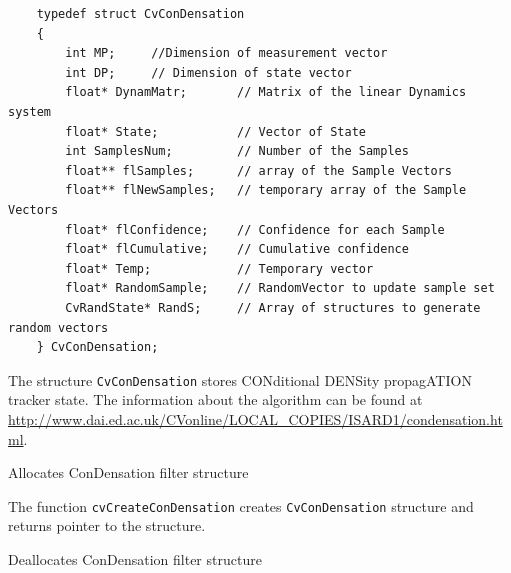 \begin{lstlisting}
    typedef struct CvConDensation
    {
        int MP;     //Dimension of measurement vector
        int DP;     // Dimension of state vector
        float* DynamMatr;       // Matrix of the linear Dynamics system
        float* State;           // Vector of State
        int SamplesNum;         // Number of the Samples
        float** flSamples;      // array of the Sample Vectors
        float** flNewSamples;   // temporary array of the Sample Vectors
        float* flConfidence;    // Confidence for each Sample
        float* flCumulative;    // Cumulative confidence
        float* Temp;            // Temporary vector
        float* RandomSample;    // RandomVector to update sample set
        CvRandState* RandS;     // Array of structures to generate random vectors
    } CvConDensation;

\end{lstlisting}
The structure \texttt{CvConDensation} stores CONditional DENSity propagATION tracker state. The information about the algorithm can be found at \url{http://www.dai.ed.ac.uk/CVonline/LOCAL\_COPIES/ISARD1/condensation.html}.

\label{CreateConDensation}

Allocates ConDensation filter structure


\begin{description}
\end{description}

The function \texttt{cvCreateConDensation} creates \texttt{CvConDensation} structure and returns pointer to the structure.

\label{ReleaseConDensation}

Deallocates ConDensation filter structure

\begin{description}
\end{description}

